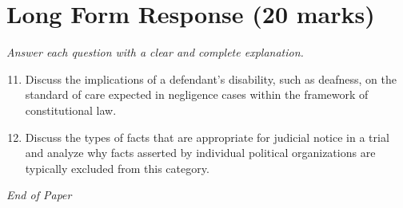 \documentclass[12pt]{article}
\begin{document}
\section*{Long Form Response (20 marks)}
\textit{Answer each question with a clear and complete explanation.}
\begin{enumerate}[label=\arabic*.]
\setcounter{enumi}{10}
\item Discuss the implications of a defendant's disability, such as deafness, on the standard of care expected in negligence cases within the framework of constitutional law.
\item Discuss the types of facts that are appropriate for judicial notice in a trial and analyze why facts asserted by individual political organizations are typically excluded from this category.
\end{enumerate}

\vfill
\noindent\textit{End of Paper}
\end{document}

